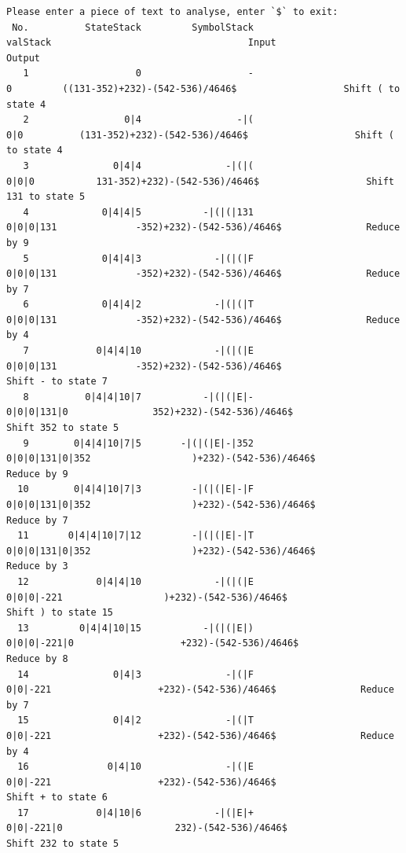 \documentclass[UTF8]{ctexart}
\begin{document}
\begin{lstlisting}
Please enter a piece of text to analyse, enter `$` to exit:
 No.          StateStack         SymbolStack                      valStack                                   Input                   Output
   1                   0                   -                             0         ((131-352)+232)-(542-536)/4646$                   Shift ( to state 4
   2                 0|4                 -|(                           0|0          (131-352)+232)-(542-536)/4646$                   Shift ( to state 4
   3               0|4|4               -|(|(                         0|0|0           131-352)+232)-(542-536)/4646$                   Shift 131 to state 5
   4             0|4|4|5           -|(|(|131                     0|0|0|131              -352)+232)-(542-536)/4646$               Reduce by 9
   5             0|4|4|3             -|(|(|F                     0|0|0|131              -352)+232)-(542-536)/4646$               Reduce by 7
   6             0|4|4|2             -|(|(|T                     0|0|0|131              -352)+232)-(542-536)/4646$               Reduce by 4
   7            0|4|4|10             -|(|(|E                     0|0|0|131              -352)+232)-(542-536)/4646$                   Shift - to state 7
   8          0|4|4|10|7           -|(|(|E|-                   0|0|0|131|0               352)+232)-(542-536)/4646$                   Shift 352 to state 5
   9        0|4|4|10|7|5       -|(|(|E|-|352               0|0|0|131|0|352                  )+232)-(542-536)/4646$               Reduce by 9
  10        0|4|4|10|7|3         -|(|(|E|-|F               0|0|0|131|0|352                  )+232)-(542-536)/4646$               Reduce by 7
  11       0|4|4|10|7|12         -|(|(|E|-|T               0|0|0|131|0|352                  )+232)-(542-536)/4646$               Reduce by 3
  12            0|4|4|10             -|(|(|E                    0|0|0|-221                  )+232)-(542-536)/4646$                   Shift ) to state 15
  13         0|4|4|10|15           -|(|(|E|)                  0|0|0|-221|0                   +232)-(542-536)/4646$               Reduce by 8
  14               0|4|3               -|(|F                      0|0|-221                   +232)-(542-536)/4646$               Reduce by 7
  15               0|4|2               -|(|T                      0|0|-221                   +232)-(542-536)/4646$               Reduce by 4
  16              0|4|10               -|(|E                      0|0|-221                   +232)-(542-536)/4646$                   Shift + to state 6
  17            0|4|10|6             -|(|E|+                    0|0|-221|0                    232)-(542-536)/4646$                   Shift 232 to state 5

\end{lstlisting}
\end{document}
